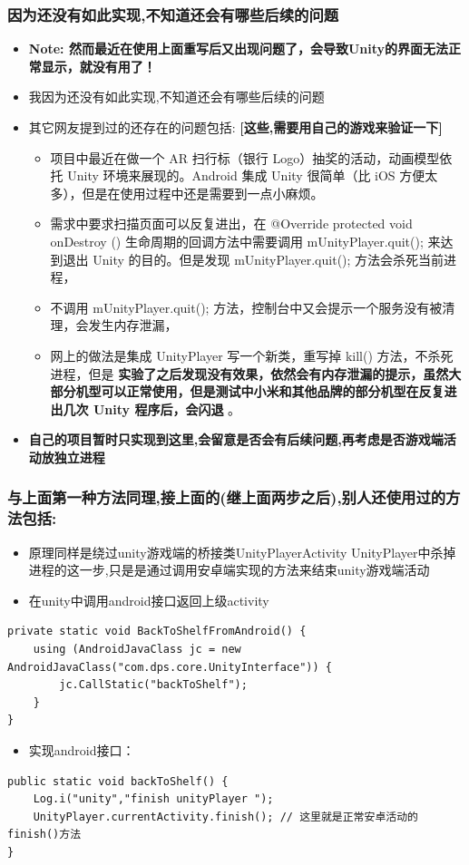 \documentclass[9pt, b5paper]{article}
\begin{document}
\subsubsection{因为还没有如此实现,不知道还会有哪些后续的问题}
\label{sec-1-2-2}
\begin{itemize}
\item \textbf{Note: 然而最近在使用上面重写后又出现问题了，会导致Unity的界面无法正常显示，就没有用了！}
\item 我因为还没有如此实现,不知道还会有哪些后续的问题
\item 其它网友提到过的还存在的问题包括: \textbf{[这些,需要用自己的游戏来验证一下]}
\begin{itemize}
\item 项目中最近在做一个 AR 扫行标（银行 Logo）抽奖的活动，动画模型依托 Unity 环境来展现的。Android 集成 Unity 很简单（比 iOS 方便太多），但是在使用过程中还是需要到一点小麻烦。
\item 需求中要求扫描页面可以反复进出，在 @Override protected void onDestroy () 生命周期的回调方法中需要调用 mUnityPlayer.quit(); 来达到退出 Unity 的目的。但是发现 mUnityPlayer.quit(); 方法会杀死当前进程，
\item 不调用 mUnityPlayer.quit(); 方法，控制台中又会提示一个服务没有被清理，会发生内存泄漏，
\item 网上的做法是集成 UnityPlayer 写一个新类，重写掉 kill() 方法，不杀死进程，但是 \textbf{实验了之后发现没有效果，依然会有内存泄漏的提示，虽然大部分机型可以正常使用，但是测试中小米和其他品牌的部分机型在反复进出几次 Unity 程序后，会闪退} 。
\end{itemize}
\item \textbf{自己的项目暂时只实现到这里,会留意是否会有后续问题,再考虑是否游戏端活动放独立进程}
\end{itemize}
\subsubsection{与上面第一种方法同理,接上面的(继上面两步之后),别人还使用过的方法包括:}
\label{sec-1-2-3}
\begin{itemize}
\item 原理同样是绕过unity游戏端的桥接类UnityPlayerActivity UnityPlayer中杀掉进程的这一步,只是是通过调用安卓端实现的方法来结束unity游戏端活动
\item 在unity中调用android接口返回上级activity
\end{itemize}
\begin{verbatim}
private static void BackToShelfFromAndroid() {
    using (AndroidJavaClass jc = new AndroidJavaClass("com.dps.core.UnityInterface")) {
        jc.CallStatic("backToShelf");
    }
}
\end{verbatim}
\begin{itemize}
\item 实现android接口：
\end{itemize}
\begin{verbatim}
public static void backToShelf() {
    Log.i("unity","finish unityPlayer ");
    UnityPlayer.currentActivity.finish(); // 这里就是正常安卓活动的finish()方法
}
\end{verbatim}
\end{document}
